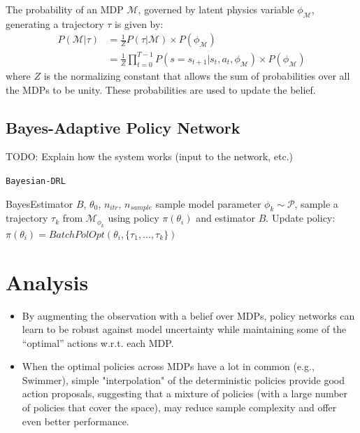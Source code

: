 \documentclass{article}
\DeclareMathOperator*{\argmin}{arg\,min}
\begin{document}
The probability of an MDP $\mathcal{M}$, governed by latent physics variable $\phi_{\mathcal{M}}$, generating a trajectory $\tau$ is given by:
\begin{align}
P(\mathcal{M} | \tau) &= \frac{1}{Z}P(\tau | \mathcal{M}) \times P(\phi_\mathcal{M}) \nonumber \\
					  &= \frac{1}{Z}\prod_{t = 0}^{T-1}{P(s = s_{t+1}|s_t, a_t, \phi_\mathcal{M})} \times P(\phi_\mathcal{M})
\end{align}
where $Z$ is the normalizing constant that allows the sum of probabilities over all the MDPs to be unity. These probabilities are used to update the belief.

\subsection{Bayes-Adaptive Policy Network}

TODO: Explain how the system works (input to the network, etc.)
%
%
\begin{algorithm}[tb]
\caption{\texttt{Bayesian-DRL}}
\label{alg:highLevel}
\begin{algorithmic}[1]
\State BayesEstimator $B$, $\theta_0$, $n_{itr}$, $n_{sample}$
\vspace{2mm}
    \State sample model parameter $\phi_k \sim \mathcal{P}$,
    \State sample a trajectory $\tau_k$ from $\mathcal{M}_{\phi_k}$ using policy $\pi(\theta_i)$ and estimator $B$.
  \EndFor
\EndFor
\State Update policy: $\pi(\theta_i) = BatchPolOpt(\theta_i, \{\tau_1, ..., \tau_k\})$
\end{algorithmic}
\end{algorithm}

\section{Analysis}

\begin{itemize}
	\item By augmenting the observation with a belief over 	MDPs, policy networks can learn to be robust against 	model uncertainty while maintaining some of the
	``optimal'' actions w.r.t. each MDP.
	\item When the optimal policies across MDPs have a lot in 	common (e.g., Swimmer), simple "interpolation" of the deterministic policies provide good action proposals,
	suggesting that a mixture of policies (with a large number of policies that cover the space), may reduce sample complexity and offer even better performance.
\end{itemize}
\end{document}
